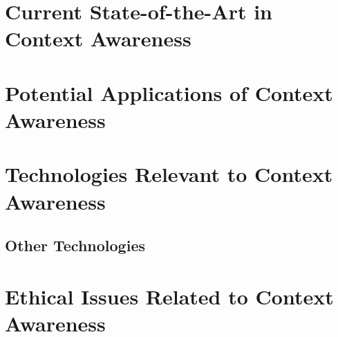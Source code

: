 \section{Current State-of-the-Art in Context Awareness}


\section{Potential Applications of Context Awareness}


\section{Technologies Relevant to Context Awareness}

\subsection{Other Technologies}

\section{Ethical Issues Related to Context Awareness}